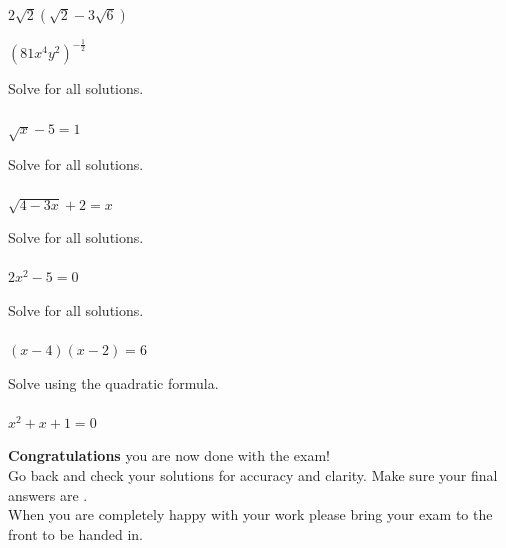 \documentclass[addpoints,18pt,answers]{exam}
\begin{document}
\begin{questions}
\question[4] $2\sqrt{2}(\sqrt{2}-3\sqrt{6})$
\answerline

\newpage
{}

\question[4]\label{rad-simp-end} $(81x^4y^2)^{-\frac{1}{2}}$
\answerline

\newpage

\question[4] Solve for all solutions.\\ \\ $\sqrt{x}-5=1$
\answerline

\newpage

\question[5] Solve for all solutions.\\ \\ $\sqrt{4-3x}+2=x$
\answerline

\newpage

\question[4] Solve for all solutions.\\ \\ $2x^2-5=0$
\answerline

\newpage

\question[5] Solve for all solutions.\\ \\ $(x-4)(x-2)=6$
\answerline

\newpage

\question[4] Solve using the quadratic formula.\\ \\ $x^2+x+1=0$
\answerline

\end{questions}

\newpage
\changefontsize{18pt}

\begin{tcolorbox}[colback=gray!15,colframe=black]
{\Large \textbf{Congratulations} you are now done with the exam!}\\

{Go back and check your solutions for accuracy and clarity.  Make sure your final answers are . }\\

{When you are completely happy with your work please bring your exam to the front to be handed in. }
\end{tcolorbox}
\end{document}
